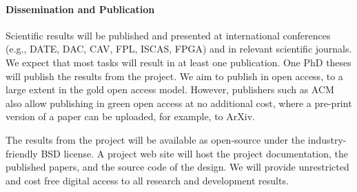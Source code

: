 \documentclass[fleqn,12pt]{article}
\begin{document}





\paragraph*{Dissemination and Publication}

Scientific results will be published and presented at international
conferences (e.g., DATE, DAC, CAV, FPL, ISCAS, FPGA) and in relevant scientific journals.
We expect that most tasks will result in at least one publication.
One PhD theses will publish the results from the project.
We aim to publish in open access, to a large extent in the gold open access model.
However, publishers such as ACM also allow publishing in green open access
at no additional cost, where a pre-print version of a paper can be uploaded,
for example, to ArXiv.

The results from the project will be available as open-source under the
industry-friendly BSD license.
A project web site will host the project documentation, the published papers, and the
source code of the design.
We will provide unrestricted and cost free digital access to all research and development results.
\end{document}
